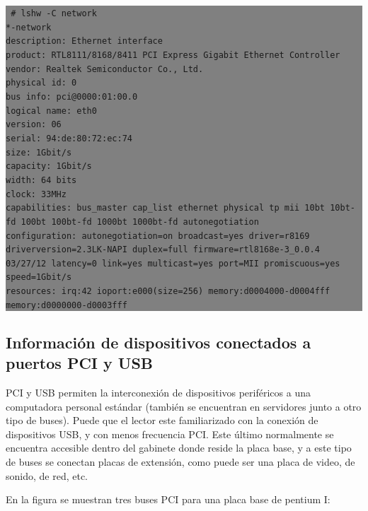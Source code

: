 \documentclass[12pt]{article}
\begin{document}
\colorbox{grey}{\parbox[t]{0.95\linewidth}{ \vspace*{0.5cm} { 
{\tt \scriptsize
\# lshw -C network\\
  *-network\\
       description: Ethernet interface\\
       product: RTL8111/8168/8411 PCI Express Gigabit Ethernet Controller\\
       vendor: Realtek Semiconductor Co., Ltd.\\
       physical id: 0\\
       bus info: pci@0000:01:00.0\\
       logical name: eth0\\
       version: 06\\
       serial: 94:de:80:72:ec:74\\
       size: 1Gbit/s\\
       capacity: 1Gbit/s\\
       width: 64 bits\\
       clock: 33MHz\\
       capabilities: bus\_master cap\_list ethernet physical tp mii 10bt 10bt-fd 100bt 100bt-fd 1000bt 1000bt-fd autonegotiation\\
       configuration: autonegotiation=on broadcast=yes driver=r8169 driverversion=2.3LK-NAPI duplex=full firmware=rtl8168e-3\_0.0.4 03/27/12 latency=0 link=yes multicast=yes port=MII promiscuous=yes speed=1Gbit/s\\
       resources: irq:42 ioport:e000(size=256) memory:d0004000-d0004fff memory:d0000000-d0003fff\\
}
} \vspace*{0.5cm} } } 


\subsection*{Información de dispositivos conectados a puertos PCI y USB}

PCI y USB permiten la interconexión de dispositivos periféricos a una computadora 
personal estándar (también se encuentran en servidores junto a otro tipo de buses). 
Puede que el lector este familiarizado con la conexión de 
dispositivos USB, y con menos frecuencia PCI. Este último normalmente se encuentra 
accesible dentro del gabinete donde reside la placa base, y a este tipo de buses se
conectan placas de extensión, como puede ser una placa de video, de sonido, de red, etc.   

En la figura se muestran tres buses PCI para una placa base de pentium I:
\end{document}
